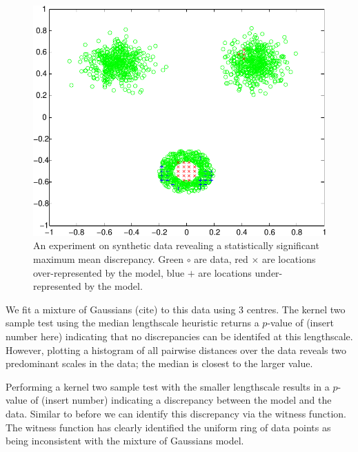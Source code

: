 \documentclass{article}
\begin{document}
\begin{figure}[ht]
\centering
\includegraphics[width=0.98\columnwidth]{figures/blob_blob_ring}
\caption{
An experiment on synthetic data revealing a statistically significant maximum mean discrepancy.
Green $\circ$ are data, red $\times$ are locations over-represented by the model, blue $+$ are locations under-represented by the model.
}
\label{fig:blob_blob_ring}
\end{figure}

We fit a mixture of Gaussians (cite) to this data using 3 centres.
The kernel two sample test using the median lengthscale heuristic returns a $p$-value of (insert number here) indicating that no discrepancies can be identifed at this lengthscale.
However, plotting a histogram of all pairwise distances over the data reveals two predominant scales in the data; the median is closest to the larger value.

Performing a kernel two sample test with the smaller lengthscale results in a $p$-value of (insert number) indicating a discrepancy between the model and the data.
Similar to before we can identify this discrepancy via the witness function.
The witness function has clearly identified the uniform ring of data points as being inconsistent with the mixture of Gaussians model.

\end{document}
